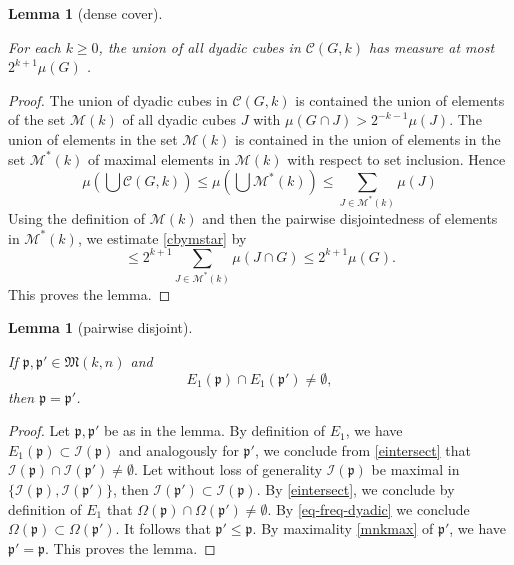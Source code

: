 \documentclass[10pt,a4paper]{article}
\theoremstyle{plain}
\newtheorem{lemma}[theorem]{Lemma}
\theoremstyle{definition}
\numberwithin{equation}{subsection}
\newcommand{\fp}{{\mathfrak p}}
\newcommand{\fc}{{\Omega}}
\newcommand{\scI}{{\mathcal{I}}} %
\newcommand{\lean}[1]{}
\newcommand{\leanok}{}
\begin{document}
\begin{lemma}[dense cover]
\label{dense-cover}
\leanok
\lean{dense_cover}

For each $k\ge 0$, the union of all dyadic cubes
in $\mathcal{C}(G,k)$ has measure at most $2^{k+1} \mu(G)$ .
\end{lemma}
\begin{proof}
\leanok
The union of dyadic cubes in $\mathcal{C}(G,k)$
is contained the union of elements of the set $\mathcal{M}(k)$
of all dyadic cubes $J$ with
${\mu(G \cap J)} > 2^{-k-1}{\mu(J)}$.
The union of elements in the set $\mathcal{M}(k)$ is contained in the union of elements in
the set $\mathcal{M}^*(k)$ of maximal elements in
$\mathcal{M}(k)$ with respect to set inclusion. Hence
\begin{equation}\label{cbymstar}
\mu (\bigcup \mathcal{C}(G,k))\le \mu (\bigcup \mathcal{M}^*(k))\le
\sum_{J\in \mathcal{M}^*(k)}\mu(J)
\end{equation}
Using the definition of $\mathcal{M}(k)$ and then
the pairwise disjointedness of elements in
$\mathcal{M}^*(k)$,
we estimate \eqref{cbymstar} by
\begin{equation}
\le
2^{k+1}\sum_{J\in \mathcal{M}^*(k)}\mu(J\cap G)
\le 2^{k+1}\mu(G).
\end{equation}
This proves the lemma.
\end{proof}

\begin{lemma}[pairwise disjoint]
    \label{pairwise-disjoint}
    \leanok
    \lean{pairwiseDisjoint_E1}
    If $\fp, \fp' \in {\mathfrak{M}}(k,n)$ and
    \begin{equation}\label{eintersect}
        {E_1}(\fp)\cap {E_1}(\fp')\neq \emptyset,
    \end{equation}
    then $\fp=\fp'$.
\end{lemma}
\begin{proof}
\leanok
Let $\fp,\fp'$ be as in the lemma. By definition of $E_1$,
we have
$E_1(\fp)\subset \scI(\fp)$ and analogously for $\fp'$, we conclude from \eqref{eintersect} that $\scI(\fp)\cap \scI(\fp')\neq \emptyset$. Let without loss of generality $\scI(\fp)$ be maximal in
$\{\scI(\fp),\scI(\fp')\}$, then $\scI(\fp')\subset \scI(\fp)$.
By \eqref{eintersect}, we conclude by definition of $E_1$ that $\fc(\fp)\cap \fc(\fp')\neq \emptyset$. By
\eqref{eq-freq-dyadic} we conclude $\fc(\fp)\subset \fc(\fp')$. It follows that $\fp'\le \fp$. By maximality
\eqref{mnkmax}
of $\fp'$, we have $\fp'=\fp$. This proves the lemma.
\end{proof}
\end{document}
